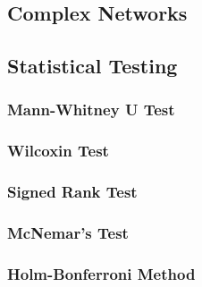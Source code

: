 \subsection{Complex Networks}


\subsection{Statistical Testing}
\subsubsection{Mann-Whitney U Test}
\subsubsection{Wilcoxin Test}
\subsubsection{Signed Rank Test}
\subsubsection{McNemar's Test}
\subsubsection{Holm-Bonferroni Method}



